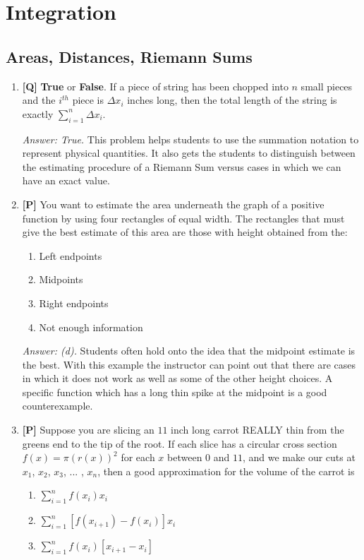 \documentclass[12pt]{article}
\begin{document}
\pagebreak
\section{Integration}

\subsection{Areas, Distances, Riemann Sums}

\begin{enumerate}

\item {\bf [Q]} \textbf{True} or \textbf{False}. If a piece of string has
been chopped into $n$ small pieces and the $i^{th}$ piece is
$\Delta x_i$ inches long, then the total length of the string is
exactly $\displaystyle{ \sum_{i=1}^n\Delta x_i}$.

{\it Answer: True.} This problem helps students to use the
summation notation to represent physical quantities. It also gets
the students to distinguish between the estimating procedure of a
Riemann Sum versus cases in which we can have an exact value.

\bigskip

\item {\bf [P]}
You want to estimate the area underneath the graph of a positive
function by using four rectangles of equal width. The rectangles
that must give the best estimate of this area are those with
height obtained from the:

\begin{enumerate}
\item Left endpoints
\item Midpoints
\item Right endpoints
\item Not enough information
\end{enumerate}

{\it Answer: (d).} Students often hold onto the idea that the
midpoint estimate is the best. With this example the instructor
can point out that there are cases in which it does not work as
well as some of the other height choices. A specific function
which has a long thin spike at the midpoint is a good
counterexample. 

\bigskip

\item {\bf [P]} Suppose you are slicing an $11$ inch long carrot REALLY thin
from the greens end to the tip of the root.  If each slice has a
circular cross section $f(x)=\pi (r(x))^2$ for each $x$ between $0$ and
$11$, and we make our cuts at $x_1$, $x_2$, $x_3$, ... , $x_n$, then a good approximation 
for the volume of the carrot is
\begin{enumerate}
\item $\sum_{i=1}^n f(x_i) x_i$
\item $\sum_{i=1}^n [f(x_{i+1})-f(x_i)] x_i$
\item $\sum_{i=1}^n f(x_i) [x_{i+1}-x_i]$
\end{enumerate}


\end{enumerate}
\end{document}
